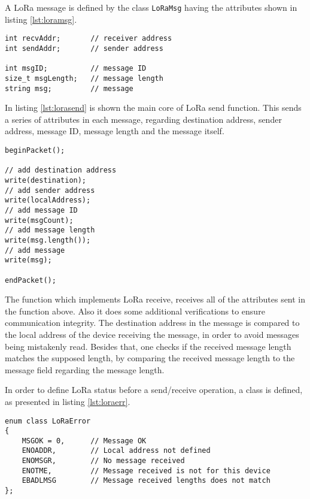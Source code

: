 A LoRa message is defined by the class \verb|LoRaMsg| having the attributes shown in listing \ref{lst:loramsg}.

\begin{lstlisting}[caption={LoRa message.}, label={lst:loramsg}]
int recvAddr;     	// receiver address
int sendAddr;     	// sender address

int msgID;        	// message ID
size_t msgLength; 	// message length
string msg;       	// message
\end{lstlisting}

In listing \ref{lst:lorasend} is shown the main core of LoRa send function. This sends a series of attributes in each message, regarding destination address, sender address, message ID, message length and the message itself.

\begin{lstlisting}[caption={LoRa send function.}, label={lst:lorasend}]
beginPacket();

// add destination address  
write(destination);
// add sender address
write(localAddress);
// add message ID
write(msgCount);
// add message length
write(msg.length());
// add message
write(msg);

endPacket();
\end{lstlisting}

The function which implements LoRa receive, receives all of the attributes sent in the function above. Also it does some additional verifications to ensure communication integrity. The destination address in the message is compared to the local address of the device receiving the message, in order to avoid messages being mistakenly read. Besides that, one checks if the received message length matches the supposed length, by comparing the received message length to the message field regarding the message length.

In order to define LoRa status before a send/receive operation, a class is defined, as presented in listing \ref{lst:loraerr}.
 
\begin{lstlisting}[caption={LoRaError enum class.}, label={lst:loraerr}]
enum class LoRaError
{
	MSGOK = 0,  	// Message OK
	ENOADDR,		// Local address not defined
	ENOMSGR,    	// No message received
	ENOTME,     	// Message received is not for this device
	EBADLMSG    	// Message received lengths does not match
};
\end{lstlisting}

\clearpage
